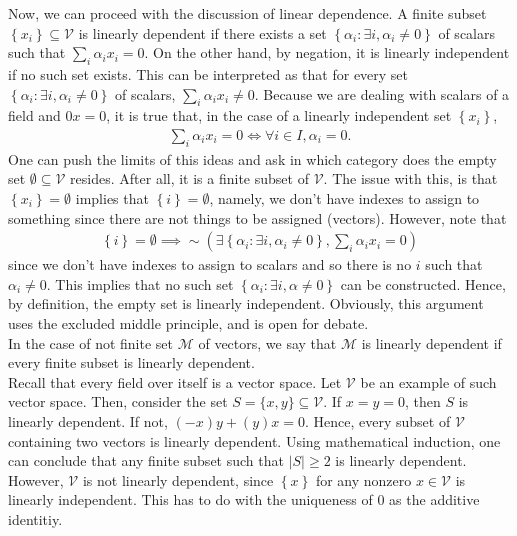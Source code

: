 \documentclass[12pt]{article}
\begin{document}
Now, we can proceed with the discussion of linear dependence. A finite subset $\left\{ x_{i} \right\}\subseteq \mathcal{V}$ is linearly dependent if there exists a set $\left\{ \alpha_{i} : \exists i, \alpha_{i} \neq 0\right\}$ of scalars such that $\sum_{i} \alpha_{i}x_{i} = 0$. On the other hand, by negation, it is linearly independent if no such set exists. This can be interpreted as that for every set $\left\{ \alpha_{i}: \exists i, \alpha_{i}\neq 0 \right\}$ of scalars, $\sum_{i} \alpha_{i}x_{i} \neq 0$. Because we are dealing with scalars of a field and $0x = 0$, it is true that, in the case of a linearly independent set $\left\{ x_{i} \right\}$,   
\begin{align*}
  \sum_{i} \alpha_{i}x_{i} =0 \iff \forall i\in I, \alpha_{i} = 0.
\end{align*}
One can push the limits of this ideas and ask in which category does the empty set $\emptyset \subseteq \mathcal{V}$ resides. After all, it is a finite subset of $\mathcal{V}$. The issue with this, is that $\left\{ x_{i} \right\} = \emptyset$ implies that $\left\{ i \right\}=\emptyset$, namely, we don't have indexes to assign to something since there are not things to be assigned (vectors). However, note that  
\begin{align*}
  \left\{ i \right\}=\emptyset \implies \sim \left( \exists \left\{ \alpha_{i}:\exists i, \alpha_{i} \neq 0 \right\}, \sum_{i}\alpha_{i} x_{i} = 0 \right)
\end{align*}
since we don't have indexes to assign to scalars and so there is no $i$ such that $\alpha_{i} \neq 0$. This implies that no such set $\left\{ \alpha_{i}: \exists i, \alpha\neq 0 \right\}$ can be constructed. Hence, by definition, the empty set is linearly independent. Obviously, this argument uses the excluded middle principle, and is open for debate.\\
In the case of not finite set $\mathcal{M}$ of vectors, we say that $\mathcal{M}$ is linearly dependent if every finite subset is linearly dependent.\\

Recall that every field over itself is a vector space. Let $\mathcal{V}$ be an example of such vector space. Then, consider the set $S=\{x,y\}\subseteq \mathcal{V}$. If $x=y=0$, then $S$ is linearly dependent. If not, $(-x)y + (y)x = 0$. Hence, every subset of $\mathcal{V}$ containing two vectors is linearly dependent. Using mathematical induction, one can conclude that any finite subset such that $|S|\geq 2$ is linearly dependent. However, $\mathcal{V}$ is not linearly dependent, since $\left\{ x \right\}$ for any nonzero $x\in\mathcal{V}$ is linearly independent. This has to do with the uniqueness of $0$ as the additive identitiy.\\
\end{document}
